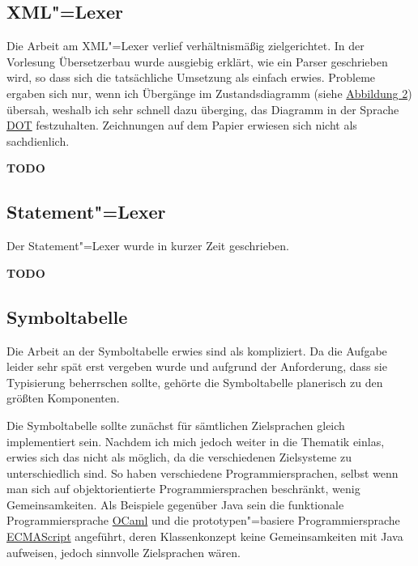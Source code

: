 \documentclass[10pt,a4paper,ngerman,titlepage,tocindentauto]{scrartcl}
\newcommand{\TODO}{ {\LARGE\bf\color{crimson} TODO} }
\begin{document}
		\subsection{XML"=Lexer}
			Die Arbeit am XML"=Lexer verlief verhältnismäßig zielgerichtet. In der Vorlesung
			Übersetzerbau wurde ausgiebig erklärt, wie ein Parser geschrieben wird, so dass
			sich die tatsächliche Umsetzung als einfach erwies. Probleme ergaben sich nur,
			wenn ich Übergänge im Zustandsdiagramm (siehe \hyperlink{Uebergangsdiagramm_XML_Lexer}{Abbildung 2})
			übersah, weshalb ich sehr schnell dazu überging, das Diagramm in der Sprache
			\href{http://www.graphviz.org/doc/info/lang.html}{DOT} festzuhalten. Zeichnungen auf
			dem Papier erwiesen sich nicht als sachdienlich.
		
			\TODO
		
		\subsection{Statement"=Lexer}
			Der Statement"=Lexer wurde in kurzer Zeit geschrieben.
			
			\TODO
		
		\subsection{Symboltabelle}
			Die Arbeit an der Symboltabelle erwies sind als kompliziert. Da die Aufgabe leider sehr spät erst
			vergeben wurde und aufgrund der Anforderung, dass sie Typisierung beherrschen sollte, gehörte
			die Symboltabelle planerisch zu den größten Komponenten.
			
			Die Symboltabelle sollte zunächst für sämtlichen Zielsprachen gleich implementiert sein. Nachdem
			ich mich jedoch weiter in die Thematik einlas, erwies sich das nicht als möglich, da die verschiedenen
			Zielsysteme zu unterschiedlich sind. So haben verschiedene Programmiersprachen, selbst wenn man
			sich auf objektorientierte Programmiersprachen beschränkt, wenig Gemeinsamkeiten. Als Beispiele gegenüber
			Java sein die funktionale Programmiersprache \href{http://caml.inria.fr/ocaml/}{OCaml} und die prototypen"=basiere
			Programmiersprache \href{http://www.ecma-international.org/publications/standards/Ecma-262.htm}{ECMAScript}
			angeführt, deren Klassenkonzept keine Gemeinsamkeiten mit Java aufweisen, jedoch sinnvolle Zielsprachen
			wären.
			
\end{document}

